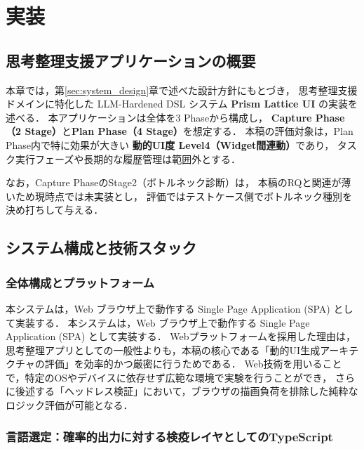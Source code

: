\documentclass[a4paper,10pt]{jarticle}
\begin{document}
\section{実装}
\label{sec:implementation}

\subsection{思考整理支援アプリケーションの概要}

本章では，第\ref{sec:system_design}章で述べた設計方針にもとづき，
思考整理支援ドメインに特化した LLM-Hardened DSL システム \textbf{Prism Lattice UI} の実装を述べる．
本アプリケーションは全体を3 Phaseから構成し，
\textbf{Capture Phase（2 Stage）}と\textbf{Plan Phase（4 Stage）}を想定する．
本稿の評価対象は，Plan Phase内で特に効果が大きい
\textbf{動的UI度 Level4（Widget間連動）}であり，
タスク実行フェーズや長期的な履歴管理は範囲外とする．

なお，Capture PhaseのStage2（ボトルネック診断）は，
本稿のRQと関連が薄いため現時点では未実装とし，
評価ではテストケース側でボトルネック種別を決め打ちして与える．


\subsection{システム構成と技術スタック}

\subsubsection{全体構成とプラットフォーム}

本システムは，Web ブラウザ上で動作する Single Page Application (SPA) として実装する．
本システムは，Web ブラウザ上で動作する Single Page Application (SPA) として実装する．
Webプラットフォームを採用した理由は，思考整理アプリとしての一般性よりも，本稿の核心である「動的UI生成アーキテクチャの評価」を効率的かつ厳密に行うためである．
Web技術を用いることで，特定のOSやデバイスに依存せず広範な環境で実験を行うことができ，
さらに後述する「ヘッドレス検証」において，ブラウザの描画負荷を排除した純粋なロジック評価が可能となる．

\subsubsection{言語選定：確率的出力に対する検疫レイヤとしてのTypeScript}
\end{document}
